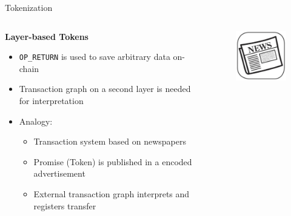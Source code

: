 \documentclass[handout]{beamer}
\begin{document}
\begin{frame}{Tokenization}
	\begin{columns}
		\begin{column}{0.65\textwidth}
			\textbf{Layer-based Tokens}
			\begin{itemize}
				\item<1 -> \texttt{OP\_RETURN} is used to save arbitrary data on-chain 
				\item<2 -> Transaction graph on a second layer is needed for interpretation
				\item<3 -> Analogy:
				\begin{itemize}
					\item<4 -> Transaction system based on newspapers
					\item<4 -> Promise (Token) is published in a encoded advertisement
					\item<4 -> External transaction graph interprets and registers transfer
				\end{itemize}
			\end{itemize}
		\end{column}
		\begin{column}{0.4\textwidth}
			\begin{figure}
				\centering
				\includegraphics[width = 3.5cm]{../assets/images/newspaper.jpg}
			\end{figure}
		\end{column}
	\end{columns}
\end{frame}

\end{document}
